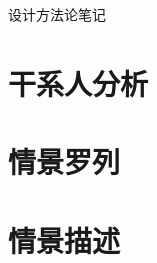 \documentclass{article}
\begin{document}
设计方法论笔记

\section{干系人分析}

\section{情景罗列}

\section{情景描述}
\end{document}
